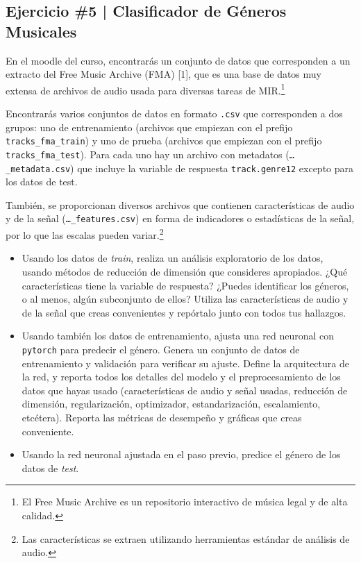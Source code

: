 \newpage

\begin{myblock}
\section*{Ejercicio \#5 | Clasificador de Géneros Musicales}

En el moodle del curso, encontrarás un conjunto de datos que corresponden a un extracto del Free Music Archive (FMA) [1], que es una base de datos muy extensa de archivos de audio usada para diversas tareas de MIR.\footnote{El Free Music Archive es un repositorio interactivo de música legal y de alta calidad.}

Encontrarás varios conjuntos de datos en formato \texttt{.csv} que corresponden a dos grupos: uno de entrenamiento (archivos que empiezan con el prefijo \texttt{tracks\_fma\_train}) y uno de prueba (archivos que empiezan con el prefijo \texttt{tracks\_fma\_test}). Para cada uno hay un archivo con metadatos (\texttt{\dots\_metadata.csv}) que incluye la variable de respuesta \texttt{track.genre12} excepto para los datos de test.

También, se proporcionan diversos archivos que contienen características de audio y de la señal (\texttt{\dots\_features.csv}) en forma de indicadores o estadísticas de la señal, por lo que las escalas pueden variar.\footnote{Las características se extraen utilizando herramientas estándar de análisis de audio.}

\begin{itemize}
    \item Usando los datos de \textit{train}, realiza un análisis exploratorio de los datos, usando métodos de reducción de dimensión que consideres apropiados. ¿Qué características tiene la variable de respuesta? ¿Puedes identificar los géneros, o al menos, algún subconjunto de ellos? Utiliza las características de audio y de la señal que creas convenientes y repórtalo junto con todos tus hallazgos.

    \item Usando también los datos de entrenamiento, ajusta una red neuronal con \texttt{pytorch} para predecir el género. Genera un conjunto de datos de entrenamiento y validación para verificar su ajuste. Define la arquitectura de la red, y reporta todos los detalles del modelo y el preprocesamiento de los datos que hayas usado (características de audio y señal usadas, reducción de dimensión, regularización, optimizador, estandarización, escalamiento, etcétera). Reporta las métricas de desempeño y gráficas que creas conveniente.

    \item Usando la red neuronal ajustada en el paso previo, predice el género de los datos de \textit{test}.
\end{itemize}

\end{myblock}

